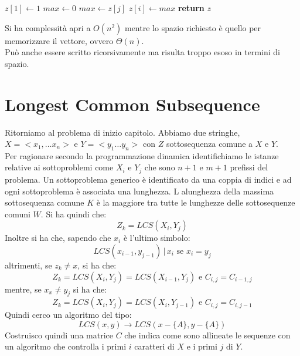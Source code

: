 \documentclass[a4paper,12pt, oneside]{book}
\begin{document}
\begin{algorithm}
  \begin{algorithmic}
    \State $z[1]\gets 1$
    \State $max \gets 0$
    \State $max\gets z[j]$
    \EndIf
    \EndFor
    \State $z[i]\gets max$
    \EndFor
    \State \textbf{return} $z$ 
    \EndFunction
  \end{algorithmic}
\end{algorithm}


Si ha complessità apri a $O(n^2)$ mentre lo spazio richiesto è quello
per memorizzare il vettore, ovvero $\Theta(n)$.\\
Può anche essere scritto ricorsivamente ma risulta troppo esoso in
termini di spazio.
\section{Longest Common Subsequence}
Ritorniamo al problema di inizio capitolo. Abbiamo due stringhe,
$X=<x_1,\ldots x_n>$ e $Y=<y_1\ldots y_n>$ con $Z$ sottosequenza
comune a $X$ e $Y$.\\
Per ragionare secondo la programmazione dinamica identifichiamo le
istanze relative ai sottoproblemi come $X_i$ e $Y_j$ che sono $n+1$ e
$m+1$ prefissi del problema. Un sottoproblema generico è identificato
da una coppia di indici e ad ogni sottoproblema è associata una
lunghezza. L alunghezza della massima sottosequenza comune $K$ è la
maggiore tra tutte le lunghezze delle sottosequenze comuni $W$.
Si ha quindi che:
\[Z_k=LCS(X_i, Y_j)\]
Inoltre si ha che, sapendo che $x_i$ è l'ultimo simbolo:
\[LCS(x_{i-1},y_{j-1})\, |\, x_i  \mbox{ se } x_i=y_j\]
altrimenti, se $z_k\neq x$, si ha che:
\[Z_{k}=LCS\left(X_{i}, Y_{j}\right)=LCS\left(X_{i-1},
    Y_{j}\right)   \text { e } C_{i, j}=C_{i-1, j}\]
mentre, se $x_x\neq y_j$ si ha che:
\[Z_k=LCS\left(X_{i}, Y_{j}\right)=LCS\left(X_{i}, Y_{j-1}\right)
  \text { e } C_{i, j}=C_{i, j-1}\]
Quindi cerco un algoritmo del tipo:
\[LCS(x,y)\to LCS(x-\{A\},y-\{A\})\]
Costruisco quindi una matrice $C$ che indica come sono allineate le
sequenze con un algoritmo che controlla i primi $i$ caratteri di
$X$ e i primi $j$ di $Y$.
\end{document}
